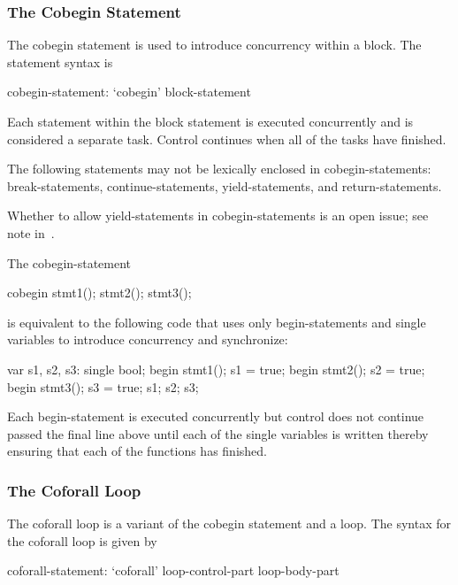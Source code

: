 \subsubsection{The Cobegin Statement}
\label{Cobegin}

The cobegin statement is used to introduce concurrency within a
block.  The  statement syntax is
\begin{syntax}
cobegin-statement:
  `cobegin' block-statement
\end{syntax}
Each statement within the block statement is executed concurrently and
is considered a separate task.  Control continues when all of the
tasks have finished.

The following statements may not be lexically enclosed in
cobegin-statements: break-statements, continue-statements,
yield-statements, and return-statements.

\begin{openissue}
Whether to allow yield-statements in cobegin-statements is an open
issue; see note in~.
\end{openissue}

\begin{example}
The cobegin-statement
\begin{chapel}
cobegin {
  stmt1();
  stmt2();
  stmt3();
}
\end{chapel}
is equivalent to the following code that uses only begin-statements
and single variables to introduce concurrency and synchronize:
\begin{chapel}
var s1, s2, s3: single bool;
begin { stmt1(); s1 = true; }
begin { stmt2(); s2 = true; }
begin { stmt3(); s3 = true; }
s1; s2; s3;
\end{chapel}
Each begin-statement is executed concurrently but control does not
continue passed the final line above until each of the single
variables is written thereby ensuring that each of the functions has
finished.
\end{example}

\subsubsection{The Coforall Loop}
\label{Coforall}

The coforall loop is a variant of the cobegin statement and a loop.
The syntax for the coforall loop is given by
\begin{syntax}
coforall-statement:
  `coforall' loop-control-part loop-body-part
\end{syntax}

